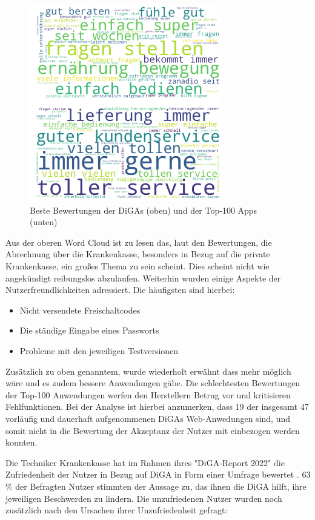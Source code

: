 \documentclass{article}
\begin{document}
			\begin{figure}[htbp]
				\centering
				\includegraphics[width=0.75\textwidth]{./grafiken/word_cloud}
				\caption[Wordcloud von DiGAs und Top-100 Anwendungen]{Beste Bewertungen der DiGAs (oben) und der Top-100 Apps (unten)}
				\label{Abb-word-cloud}
			\end{figure}   
			Aus der oberen Word Cloud ist zu lesen das, laut den Bewertungen, die Abrechnung über die Krankenkasse, besonders in Bezug auf die private Krankenkasse, ein großes Thema zu sein scheint. Dies scheint nicht wie angekündigt reibungslos abzulaufen. Weiterhin wurden einige Aspekte der Nutzerfreundlichkeiten adressiert. Die häufigsten sind hierbei:
			\begin{itemize}
				\item Nicht versendete Freischaltcodes
				\item Die ständige Eingabe eines Passworts
				\item Probleme mit den jeweiligen Testversionen 
			\end{itemize} 
			Zusätzlich zu oben genanntem, wurde wiederholt erwähnt dass mehr möglich wäre und es zudem bessere Anwendungen gäbe. Die schlechtesten Bewertungen der Top-100 Anwendungen werfen den Herstellern Betrug vor und kritisieren Fehlfunktionen. Bei der Analyse ist hierbei anzumerken, dass 19 der insgesamt 47 vorläufig und dauerhaft aufgenommenen DiGAs Web-Anwedungen sind, und somit nicht in die Bewertung der Akzeptanz der Nutzer mit einbezogen werden konnten.\par
			Die Techniker Krankenkasse hat im Rahmen ihres "DiGA-Report 2022" die Zufriedenheit der Nutzer in Bezug auf DiGA in Form einer Umfrage bewertet \cite{TK-diga-report-1}. 63 \% der Befragten Nutzer stimmten der Aussage zu, das ihnen die DiGA hilft, ihre jeweiligen Beschwerden zu lindern. Die unzufriedenen Nutzer wurden noch zusätzlich nach den Ursachen ihrer Unzufriedenheit gefragt:
\end{document}
